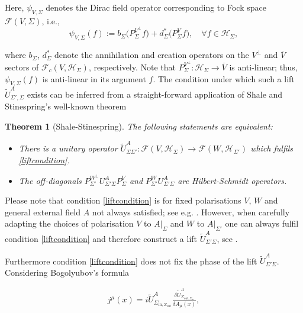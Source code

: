 \documentclass[a4paper,11pt]{article}
\newtheorem{thm}{Theorem}
\begin{document}
Here, \(\psi_{V,\Sigma}\) denotes the Dirac field operator corresponding to Fock space \(\mathcal{F}(V,\Sigma)\), i.e.,
\begin{equation}
\psi_{V,\Sigma}(f):=b_{\Sigma}\big(P^{V^\perp}_\Sigma f\big) + d^*_\Sigma\big(P^V_\Sigma f\big), \quad \forall f \in \mathcal{H}_\Sigma,
\end{equation}

where \(b_\Sigma\), \(d^*_\Sigma\) denote the annihilation and creation operators on the \(V^\perp\) and \(\overline{V}\) sectors of 
\(\mathcal{F}_c(V,\mathcal{H}_\Sigma)\), respectively. Note that \(P^{V^\perp}_\Sigma:\mathcal{H}_\Sigma\rightarrow \overline{V}\) is anti-linear; 
thus, \(\psi_{V,\Sigma}(f)\) is anti-linear in its argument \(f\). The condition under which such a lift \(\tilde{U}_{\Sigma',\Sigma}^A\) exists can be inferred from
a straight-forward application of Shale and Stinespring's well-known theorem \cite{shale stinespring?}

\begin{thm}[Shale-Stinespring]
The following statements are equivalent:
\begin{itemize}
\item There is a unitary operator \(\tilde{U}_{\Sigma \Sigma'}^A:\mathcal{F}(V,\mathcal{H}_\Sigma)\rightarrow \mathcal{F}(W,\mathcal{H}_{\Sigma'})\) which 
fulfils \eqref{liftcondition}.
\item The off-diagonals \(P_{\Sigma'}^{W^\perp} U_{\Sigma' \Sigma}^A P^V_\Sigma\) and \(P^W_{\Sigma'}U^A_{\Sigma' \Sigma}\) are Hilbert-Schmidt operators.
\end{itemize}
\end{thm}

Please note that condition \eqref{liftcondition} is for fixed polarisations \(V\), \(W\) and general external field \(A\) not always satisfied; see e.g. \cite{18 of ivp2}. 
However, when carefully adapting the choices of polarisation \(V\) to \(A |_{\Sigma}\) and \(W\) to \(A|_{\Sigma'}\) one can always fulfil condition \eqref{liftcondition}
and therefore construct a lift \(\tilde{U}_{\Sigma' \Sigma}^A\), see \cite{ivp0,ivp1,ivp2}. 

Furthermore condition \eqref{liftcondition} does not fix the phase of the lift \(\tilde{U}_{\Sigma' \Sigma}^A\). Considering Bogolyubov's formula

\begin{align}
j^\mu(x)=i \tilde{U}^A_{\Sigma_{\mathrm{in},\Sigma_{\mathrm{out}}}}\frac{\delta \tilde{U}^A_{\Sigma_{\mathrm{out},\Sigma_{\mathrm{in}}}}}{\delta A_\mu (x)},
\end{align}
\end{document}
